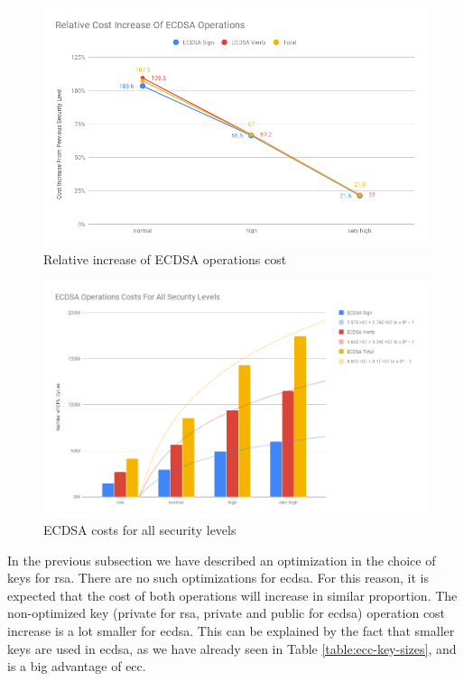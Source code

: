 \begin{figure}
  \centering
  \includegraphics[width=1.0\textwidth]{img/ecdsa_realtive_cost_increase.png}
  \centering \caption{\label{fig:ecdsa-relative-cost-incerase} Relative increase of ECDSA operations cost}
\end{figure}

\begin{figure}
  \centering
  \includegraphics[width=1.0\textwidth]{img/ecdsa_cost_all_sls.png}
  \centering \caption{\label{fig:ecdsa-costs-all-sls} ECDSA costs for all security levels}
\end{figure}

In the previous subsection we have described an optimization in the choice of keys for \gls{rsa}. There are no such optimizations
for \gls{ecdsa}. For this reason, it is expected that the cost of both operations will increase in similar proportion. The non-optimized
key (private for \gls{rsa}, private and public for \gls{ecdsa}) operation cost increase is a lot smaller for \gls{ecdsa}. This can be
explained by the fact that smaller keys are used in \gls{ecdsa}, as we have already seen in Table \ref{table:ecc-key-sizes},
and is a big advantage of \gls{ecc}.

